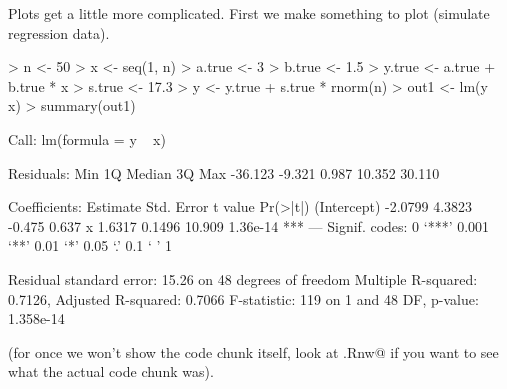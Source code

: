 \documentclass{article}
\begin{document}
\pagebreak[3]
Plots get a little more complicated.  First we make something to plot
(simulate regression data).
\begin{Schunk}
\begin{Sinput}
> n <- 50
> x <- seq(1, n)
> a.true <- 3
> b.true <- 1.5
> y.true <- a.true + b.true * x
> s.true <- 17.3
> y <- y.true + s.true * rnorm(n)
> out1 <- lm(y ~ x)
> summary(out1)
\end{Sinput}
\begin{Soutput}
Call:
lm(formula = y ~ x)

Residuals:
    Min      1Q  Median      3Q     Max 
-36.123  -9.321   0.987  10.352  30.110 

Coefficients:
            Estimate Std. Error t value Pr(>|t|)    
(Intercept)  -2.0799     4.3823  -0.475    0.637    
x             1.6317     0.1496  10.909 1.36e-14 ***
---
Signif. codes:  0 ‘***’ 0.001 ‘**’ 0.01 ‘*’ 0.05 ‘.’ 0.1 ‘ ’ 1

Residual standard error: 15.26 on 48 degrees of freedom
Multiple R-squared:  0.7126,	Adjusted R-squared:  0.7066 
F-statistic:   119 on 1 and 48 DF,  p-value: 1.358e-14
\end{Soutput}
\end{Schunk}
(for once we won't show the code chunk itself, look at \verb@foo.Rnw@
if you want to see what the actual code chunk was).
\end{document}
